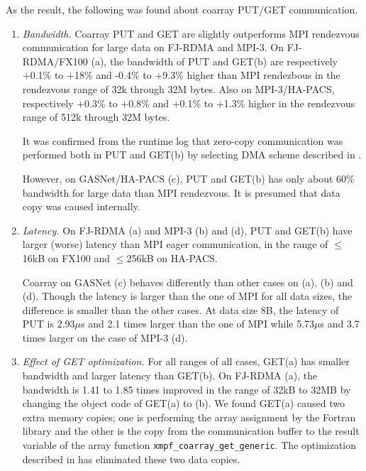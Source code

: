 
As the result, the following was found about coarray PUT/GET communication.

\begin{enumerate}

\item {\em Bandwidth.}
Coarray PUT and GET are slightly outperforms MPI rendezvous communication for large data 
on FJ-RDMA and MPI-3.
On FJ-RDMA/FX100 (a), the bandwidth of PUT and GET(b) are respectively 
+0.1\% to +18\% and -0.4\% to +9.3\% higher than MPI rendezbous in the 
rendezvous range of 32k through 32M bytes.
Also on MPI-3/HA-PACS, respectively +0.3\% to +0.8\% and 
+0.1\% to +1.3\% higher in the rendezvous range of 512k through 32M bytes.

It was confirmed from the runtime log that zero-copy communication was performed
both in PUT and GET(b) by selecting DMA scheme described in .

However, on GASNet/HA-PACS (c), PUT and GET(b) has only about 60\% bandwidth for large data
than MPI rendezvous.
It is presumed that data copy was caused internally.

\item {\em Latency.}
On FJ-RDMA (a) and MPI-3 (b) and (d), PUT and GET(b) have larger (worse) latency than 
MPI eager communication, in the range of $\leq$16kB on FX100 and $\leq$256kB on HA-PACS.

Coarray on GASNet (c) behaves differently than other cases on (a), (b) and (d).
Though the latency is larger than the one of MPI for all data sizes, the difference
is smaller than the other cases. At data size 8B, the latency of PUT is 2.93$\mu$s
and 2.1 times larger than the one of MPI 
while 5.73$\mu$s and 3.7 times larger on the case of MPI-3 (d).

\item {\em Effect of GET optimization.}
For all ranges of all cases, GET(a) has smaller bandwidth and larger latency than GET(b).
On FJ-RDMA (a), the bandwidth is 1.41 to 1.85 times improved in the range of 32kB to 32MB
by changing the object code of GET(a) to (b).
We found GET(a) caused two extra memory copies; one is performing the array assignment 
by the Fortran library and the other is the copy from the communication buffer 
to the result variable of the array function {\tt xmpf\_coarray\_get\_generic}. 
The optimization described in  has eliminated these two data copies.

\end{enumerate}

